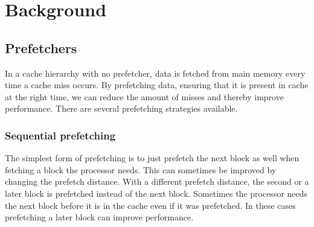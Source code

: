 \section{Background}
\label{sec:background}
\subsection{Prefetchers}


In a cache hierarchy with no prefetcher, data is fetched from main memory every time a cache miss occurs.
By prefetching data, ensuring that it is present in cache at the right time, we can reduce the amount of misses and thereby improve performance.
There are several prefetching strategies available.

\subsubsection{Sequential prefetching}

The simplest form of prefetching is to just prefetch the next block
as well when fetching a block the processor needs. This can
sometimes be improved by changing the prefetch distance. With a
different prefetch distance, the second or a later block is
prefetched instead of the next block.
Sometimes the processor needs the next block before it is in
the cache even if it was prefetched. In these cases prefetching a
later block can improve performance.

